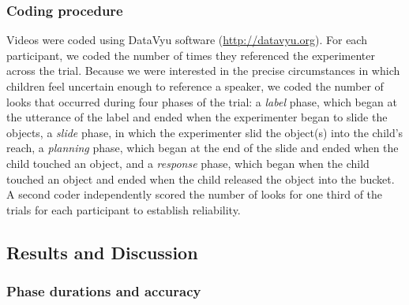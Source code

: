 \documentclass[a4paper,man,apacite,floatsintext]{apa6}
\begin{document}
\subsubsection{Coding procedure}\label{coding-procedure}

Videos were coded using DataVyu software (\url{http://datavyu.org}). For
each participant, we coded the number of times they referenced the
experimenter across the trial. Because we were interested in the precise
circumstances in which children feel uncertain enough to reference a
speaker, we coded the number of looks that occurred during four phases
of the trial: a \emph{label} phase, which began at the utterance of the
label and ended when the experimenter began to slide the objects, a
\emph{slide} phase, in which the experimenter slid the object(s) into
the child's reach, a \emph{planning} phase, which began at the end of
the slide and ended when the child touched an object, and a
\emph{response} phase, which began when the child touched an object and
ended when the child released the object into the bucket. A second coder
independently scored the number of looks for one third of the trials for
each participant to establish reliability.

\subsection{Results and Discussion}\label{results-and-discussion}

\subsubsection{Phase durations and
accuracy}\label{phase-durations-and-accuracy}
\end{document}
